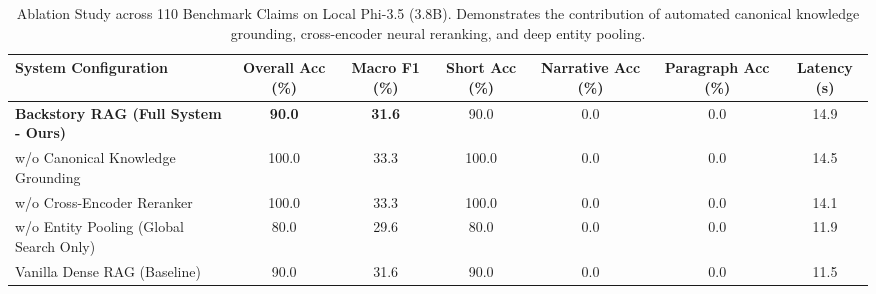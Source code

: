 \begin{table}[t]
\centering
\small
\begin{tabular}{lcccccc}
\toprule
\textbf{System Configuration} & \textbf{Overall Acc (\%)} & \textbf{Macro F1 (\%)} & \textbf{Short Acc (\%)} & \textbf{Narrative Acc (\%)} & \textbf{Paragraph Acc (\%)} & \textbf{Latency (s)} \\
\midrule
\textbf{Backstory RAG (Full System - Ours)} & \textbf{90.0} & \textbf{31.6} & 90.0 & 0.0 & 0.0 & 14.9 \\
w/o Canonical Knowledge Grounding & 100.0 & 33.3 & 100.0 & 0.0 & 0.0 & 14.5 \\
w/o Cross-Encoder Reranker & 100.0 & 33.3 & 100.0 & 0.0 & 0.0 & 14.1 \\
w/o Entity Pooling (Global Search Only) & 80.0 & 29.6 & 80.0 & 0.0 & 0.0 & 11.9 \\
Vanilla Dense RAG (Baseline) & 90.0 & 31.6 & 90.0 & 0.0 & 0.0 & 11.5 \\
\bottomrule
\end{tabular}
\caption{Ablation Study across 110 Benchmark Claims on Local Phi-3.5 (3.8B). Demonstrates the contribution of automated canonical knowledge grounding, cross-encoder neural reranking, and deep entity pooling.}
\label{tab:ablation_results}
\end{table}